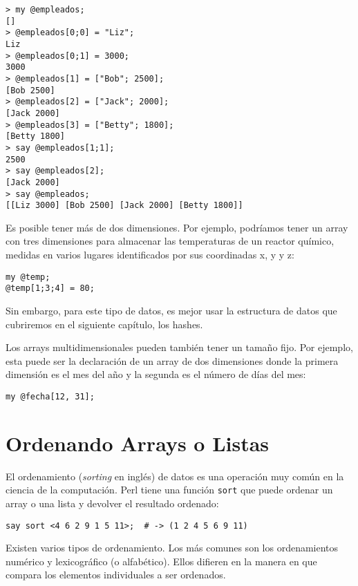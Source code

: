 \begin{verbatim}
> my @empleados;
[]
> @empleados[0;0] = "Liz";
Liz
> @empleados[0;1] = 3000;
3000
> @empleados[1] = ["Bob"; 2500];
[Bob 2500]
> @empleados[2] = ["Jack"; 2000];
[Jack 2000]
> @empleados[3] = ["Betty"; 1800];
[Betty 1800]
> say @empleados[1;1];
2500
> say @empleados[2];
[Jack 2000]
> say @empleados;
[[Liz 3000] [Bob 2500] [Jack 2000] [Betty 1800]]
\end{verbatim}

Es posible tener más de dos dimensiones. Por ejemplo, 
podríamos tener un array con tres dimensiones para almacenar
las temperaturas de un reactor químico, medidas en varios lugares
identificados por sus coordinadas x, y y z:

\begin{verbatim}
my @temp;
@temp[1;3;4] = 80;
\end{verbatim}

Sin embargo, para este tipo de datos, es mejor usar la estructura
de datos que cubriremos en el siguiente capítulo, los hashes.

Los arrays multidimensionales pueden también tener un tamaño fijo.
Por ejemplo, esta puede ser la declaración de un array de dos dimensiones
donde la primera dimensión es el mes del año y la segunda es el 
número de días del mes:

\begin{verbatim}
my @fecha[12, 31];
\end{verbatim}


\section{Ordenando Arrays o Listas}
\label{sorting}

El ordenamiento (\emph{sorting} en inglés) de datos es 
una operación muy común en la ciencia de la computación.
Perl tiene una función {\tt sort} que puede ordenar
un array o una lista y devolver el resultado ordenado:

\begin{verbatim}
say sort <4 6 2 9 1 5 11>;  # -> (1 2 4 5 6 9 11)
\end{verbatim}

Existen varios tipos de ordenamiento. Los más comunes
son los ordenamientos numérico y lexicográfico (o alfabético).
Ellos difieren en la manera en que compara los elementos
individuales a ser ordenados.

